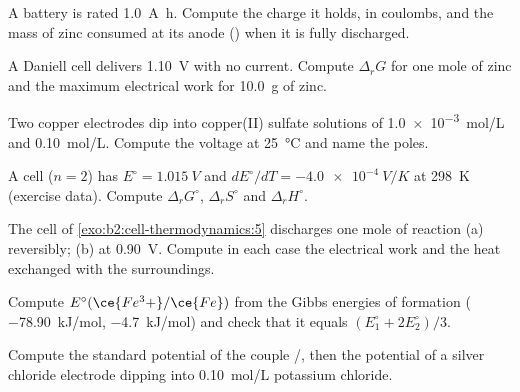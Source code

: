 \begin{exercise}[$\star$]\label{exo:b2:cell-thermodynamics:2}
A battery is rated \qty{1.0}{A.h}. Compute the charge it holds, in coulombs,
and the mass of zinc consumed at its anode () when it is
fully discharged.
\end{exercise}

\begin{exercise}[$\star$]\label{exo:b2:cell-thermodynamics:3}
A Daniell cell delivers \qty{1.10}{V} with no current. Compute $\Delta_r G$ for one
mole of zinc and the maximum electrical work for \qty{10.0}{g} of zinc.
\end{exercise}

\begin{exercise}[$\star$]\label{exo:b2:cell-thermodynamics:4}
Two copper electrodes dip into copper(II) sulfate solutions of \qty{1.0e-3}{mol/L}
and \qty{0.10}{mol/L}. Compute the voltage at \qty{25}{\degreeCelsius} and name the
poles.
\end{exercise}

\begin{exercise}[$\star\star$]\label{exo:b2:cell-thermodynamics:5}
A cell ($n = 2$) has $E^\circ = \qty{1.015}{V}$ and $dE^\circ/dT = \qty{-4.0e-4}{V/K}$
at \qty{298}{K} (exercise data). Compute $\Delta_r G^\circ$, $\Delta_r S^\circ$ and
$\Delta_r H^\circ$.
\end{exercise}

\begin{exercise}[$\star\star$]\label{exo:b2:cell-thermodynamics:6}
The cell of \cref{exo:b2:cell-thermodynamics:5} discharges one mole of reaction
(a) reversibly; (b) at \qty{0.90}{V}. Compute in each case the electrical work and
the heat exchanged with the surroundings.
\end{exercise}

\begin{exercise}[$\star\star$]\label{exo:b2:cell-thermodynamics:7}
Compute $E^\circ(\ce{Fe^3+}/\ce{Fe})$ from the Gibbs energies of formation
( \qty{-78.90}{kJ/mol},  \qty{-4.7}{kJ/mol}) and check that it
equals $(E_1^\circ + 2E_2^\circ)/3$.
\end{exercise}

\begin{exercise}[$\star\star$]\label{exo:b2:cell-thermodynamics:8}
Compute the standard potential of the couple /, then the
potential of a silver chloride electrode dipping into \qty{0.10}{mol/L}
potassium chloride.
\end{exercise}


